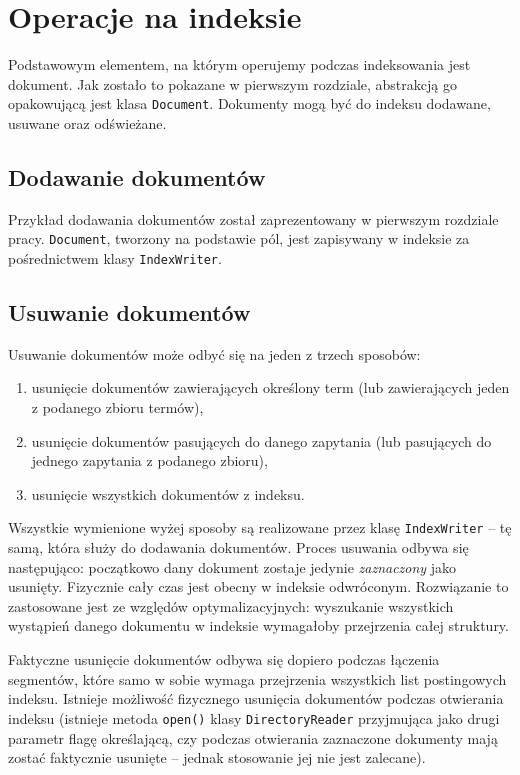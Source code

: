 \chapter{Operacje na indeksie}

Podstawowym elementem, na którym operujemy podczas indeksowania jest dokument. Jak zostało to pokazane w pierwszym rozdziale, abstrakcją go opakowującą jest klasa \texttt{Document}. Dokumenty mogą być do indeksu dodawane, usuwane oraz odświeżane.

\section{Dodawanie dokumentów}

Przykład dodawania dokumentów został zaprezentowany w pierwszym rozdziale pracy. \texttt{Document}, tworzony na podstawie pól, jest zapisywany w indeksie za pośrednictwem klasy \texttt{IndexWriter}.

\section{Usuwanie dokumentów}

Usuwanie dokumentów może odbyć się na jeden z trzech sposobów: 
\begin{enumerate}
 \item usunięcie dokumentów zawierających określony term (lub zawierających jeden z podanego zbioru termów),
 \item usunięcie dokumentów pasujących do danego zapytania (lub pasujących do jednego zapytania z podanego zbioru),
 \item usunięcie wszystkich dokumentów z indeksu.
\end{enumerate}

Wszystkie wymienione wyżej sposoby są realizowane przez klasę \texttt{IndexWriter} -- tę samą, która służy do dodawania dokumentów. Proces usuwania odbywa się następująco: początkowo dany dokument zostaje jedynie \emph{zaznaczony} jako usunięty. Fizycznie cały czas jest obecny w indeksie odwróconym. Rozwiązanie to zastosowane jest ze względów optymalizacyjnych: wyszukanie wszystkich wystąpień danego dokumentu w indeksie wymagałoby przejrzenia całej struktury. 

Faktyczne usunięcie dokumentów odbywa się dopiero podczas łączenia segmentów, które samo w sobie wymaga przejrzenia wszystkich list postingowych indeksu. Istnieje możliwość fizycznego usunięcia dokumentów podczas otwierania indeksu (istnieje metoda \texttt{open()} klasy \texttt{DirectoryReader} przyjmująca jako drugi parametr flagę określającą, czy podczas otwierania zaznaczone dokumenty mają zostać faktycznie usunięte -- jednak stosowanie jej nie jest zalecane).

